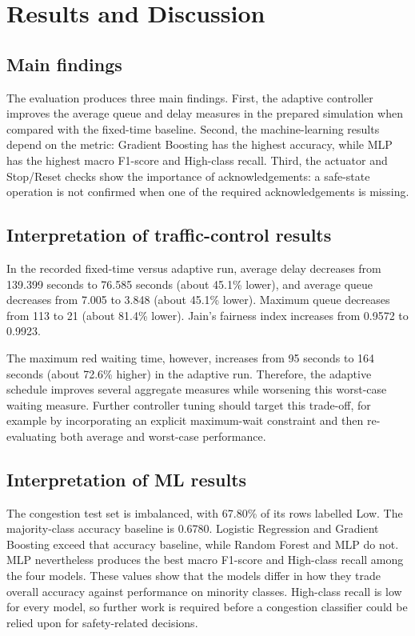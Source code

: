 \documentclass[12pt,a4paper,oneside]{report}
\begin{document}
\clearpage
\chapter{Results and Discussion}
\section{Main findings}
The evaluation produces three main findings. First, the adaptive controller improves the average queue and delay measures in the prepared simulation when compared with the fixed-time baseline. Second, the machine-learning results depend on the metric: Gradient Boosting has the highest accuracy, while MLP has the highest macro F1-score and High-class recall. Third, the actuator and Stop/Reset checks show the importance of acknowledgements: a safe-state operation is not confirmed when one of the required acknowledgements is missing.

\section{Interpretation of traffic-control results}
In the recorded fixed-time versus adaptive run, average delay decreases from 139.399 seconds to 76.585 seconds (about 45.1\% lower), and average queue decreases from 7.005 to 3.848 (about 45.1\% lower). Maximum queue decreases from 113 to 21 (about 81.4\% lower). Jain's fairness index increases from 0.9572 to 0.9923.

The maximum red waiting time, however, increases from 95 seconds to 164 seconds (about 72.6\% higher) in the adaptive run. Therefore, the adaptive schedule improves several aggregate measures while worsening this worst-case waiting measure. Further controller tuning should target this trade-off, for example by incorporating an explicit maximum-wait constraint and then re-evaluating both average and worst-case performance.

\section{Interpretation of ML results}
The congestion test set is imbalanced, with 67.80\% of its rows labelled Low. The majority-class accuracy baseline is 0.6780. Logistic Regression and Gradient Boosting exceed that accuracy baseline, while Random Forest and MLP do not. MLP nevertheless produces the best macro F1-score and High-class recall among the four models. These values show that the models differ in how they trade overall accuracy against performance on minority classes. High-class recall is low for every model, so further work is required before a congestion classifier could be relied upon for safety-related decisions.
\end{document}
